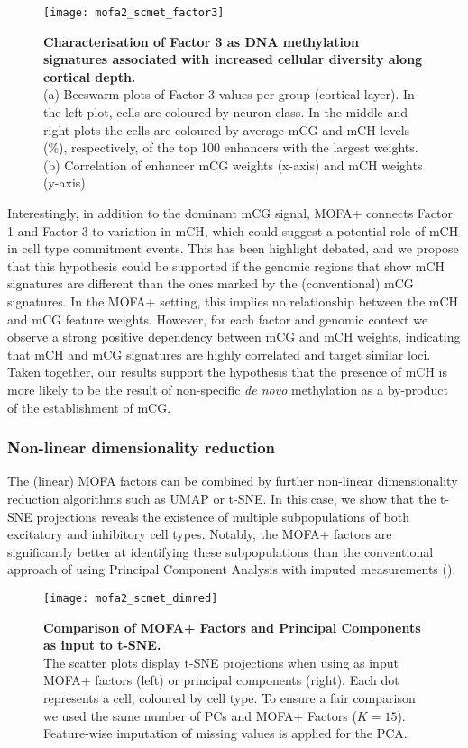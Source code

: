 \begin{figure}[H]
	\centering
	\texttt{[image: mofa2\_scmet\_factor3]}
	\caption[]{
	\textbf{Characterisation of Factor 3 as DNA methylation signatures associated with increased cellular diversity along cortical depth.} \\
	(a) Beeswarm plots of Factor 3 values per group (cortical layer). In the left plot, cells are coloured by neuron class. In the middle and right plots the cells are coloured by average mCG and mCH levels (\%), respectively, of the top 100 enhancers with the largest weights. \\
	(b) Correlation of enhancer mCG weights (x-axis) and mCH weights (y-axis).
	}
	\label{fig:mofa2_scmet_factor3}
\end{figure}

Interestingly, in addition to the dominant mCG signal, MOFA+ connects Factor 1 and Factor 3 to variation in mCH, which could suggest a potential role of mCH in cell type commitment events. This has been highlight debated, and we propose that this hypothesis could be supported if the genomic regions that show mCH signatures are different than the ones marked by the (conventional) mCG signatures. In the MOFA+ setting, this implies no relationship between the mCH and mCG feature weights. However, for each factor and genomic context we observe a strong positive dependency between mCG and mCH weights, indicating that mCH and mCG signatures are highly correlated and target similar loci.\\
Taken together, our results support the hypothesis that the presence of mCH is more likely to be the result of non-specific \textit{de novo} methylation as a by-product of the establishment of mCG.

\subsubsection{Non-linear dimensionality reduction}

The (linear) MOFA factors can be combined by further non-linear dimensionality reduction algorithms such as UMAP or t-SNE. In this case, we show that the t-SNE projections reveals the existence of multiple subpopulations of both excitatory and inhibitory cell types. Notably, the MOFA+ factors are significantly better at identifying these subpopulations than the conventional approach of using Principal Component Analysis with imputed measurements ().

\begin{figure}[H]
	\centering
	\texttt{[image: mofa2\_scmet\_dimred]}
	\caption[]{
	\textbf{Comparison of MOFA+ Factors and Principal Components as input to t-SNE.}\\
	The scatter plots display t-SNE projections when using as input MOFA+ factors (left) or principal components (right). Each dot represents a cell, coloured by cell type\cite{Luo2017}. To ensure a fair comparison we used the same number of PCs and MOFA+ Factors ($K=15$). Feature-wise imputation of missing values is applied for the PCA.
	}
	\label{fig:mofa2_scmet_dimred}
\end{figure}

